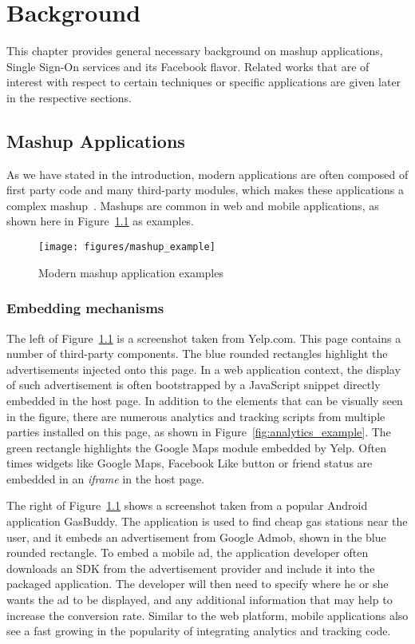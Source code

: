 \chapter{Background}

This chapter provides general necessary background on mashup applications, Single Sign-On services and its Facebook flavor.  Related works that are of interest with respect to certain techniques or specific applications are given later in the respective sections.

\section{Mashup Applications}

As we have stated in the introduction, modern applications are often composed of first party code and many third-party modules, which makes these applications a complex mashup~\cite{MashupDef}.  Mashups are common in web and mobile applications, as shown here in Figure~\ref{fig:mashup_example} as examples.

\begin{figure}[bth]
\centering
\texttt{[image: figures/mashup\_example]}
\caption{Modern mashup application examples}
\label{fig:mashup_example}
\end{figure}

\subsection{Embedding mechanisms}

The left of Figure~\ref{fig:mashup_example} is a screenshot taken from Yelp.com.  This page contains a number of third-party components.  The blue rounded rectangles highlight the advertisements injected onto this page.  In a web application context, the display of such advertisement is often bootstrapped by a JavaScript snippet directly embedded in the host page.  In addition to the elements that can be visually seen in the figure, there are numerous analytics and tracking scripts from multiple parties installed on this page, as shown in Figure~\ref{fig:analytics_example}.  The green rectangle highlights the Google Maps module embedded by Yelp.  Often times widgets like Google Maps, Facebook Like button or friend status are embedded in an \emph{iframe} in the host page.  

The right of Figure~\ref{fig:mashup_example} shows a screenshot taken from a popular Android application GasBuddy.  The application is used to find cheap gas stations near the user, and it embeds an advertisement from Google Admob, shown in the blue rounded rectangle.  To embed a mobile ad, the application developer often downloads an SDK from the advertisement provider and include it into the packaged application.  The developer will then need to specify where he or she wants the ad to be displayed, and any additional information that may help to increase the conversion rate.  Similar to the web platform, mobile applications also see a fast growing in the popularity of integrating analytics and tracking code.  

